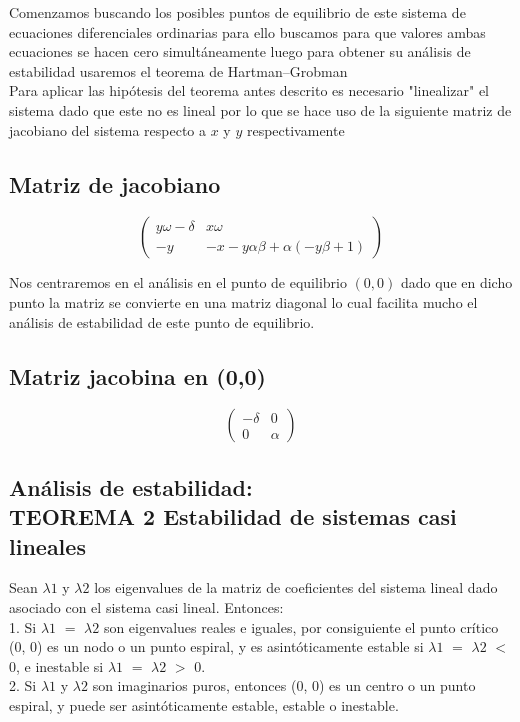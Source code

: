 \documentclass{article}
\begin{document}
  Comenzamos buscando los posibles puntos de equilibrio de este sistema de ecuaciones diferenciales ordinarias
  para ello buscamos para que valores ambas ecuaciones se hacen cero simultáneamente luego para obtener su
   análisis de estabilidad
  usaremos el teorema de Hartman–Grobman\\
  Para aplicar las hipótesis del teorema antes descrito es necesario "linealizar" el sistema dado que este no 
  es lineal por lo que se hace uso de la siguiente matriz de jacobiano del sistema respecto a  $x$ y $y$ respectivamente
 \subsection*{Matriz de jacobiano}
    \[
    \left(
    \begin{array}{lc}
      y\omega-\delta & x\omega\\
      -y & -x-y\alpha\beta+\alpha(-y\beta+1)
    \end{array}
    \right)
    \]
      
  \centering  
  
  Nos centraremos en el análisis en el punto de equilibrio $(0,0)$ dado que en dicho punto la matriz
   se convierte en una
  matriz diagonal lo cual facilita mucho el análisis de estabilidad de este punto de equilibrio.
  \subsection*{Matriz jacobina en (0,0)}
    \[
    \left(
    \begin{array}{lc}
      -\delta & 0\\
      0 & \alpha
    \end{array}
    \right)
    \]

  \noindent
    \subsection*{Análisis de estabilidad: \\ TEOREMA 2 Estabilidad de sistemas casi lineales}
      
      Sean $\lambda1$ y $\lambda2$ los eigenvalues de la matriz de
       coeficientes del sistema lineal dado 
      asociado con el sistema casi lineal. Entonces:\\
      1. Si  $\lambda1$ $=$ $\lambda2$ son eigenvalues reales e iguales, por consiguiente el punto crítico 
      (0, 0)  es un nodo o un punto espiral, y es asintóticamente estable si $\lambda1$
      $=$  $\lambda2$ $<$ 0, e inestable si $\lambda1$ $=$  $\lambda2$ $>$ 0.\\
      2. Si $\lambda1$ y $\lambda2$  son imaginarios puros, entonces (0, 0) es un centro o un punto espiral, 
      y puede ser asintóticamente estable, estable o inestable.\\
\end{document}
